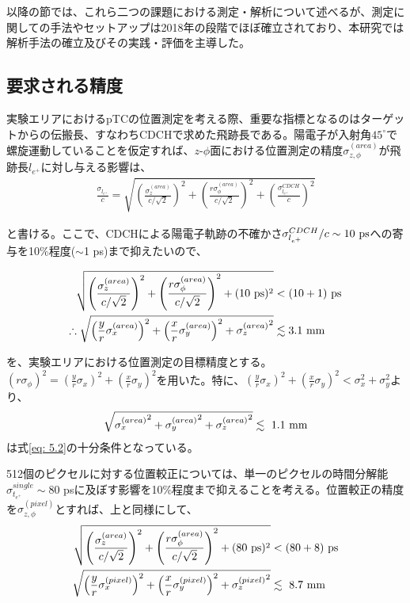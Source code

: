 \documentclass[Yonemoto_master.tex]{subfiles}
\begin{document}
以降の節では、これら二つの課題における測定・解析について述べるが、測定に関しての手法やセットアップは2018年の段階でほぼ確立されており、本研究では解析手法の確立及びその実践・評価を主導した。

\subsection{要求される精度}
実験エリアにおけるpTCの位置測定を考える際、重要な指標となるのはターゲットからの伝搬長、すなわちCDCHで求めた飛跡長である。陽電子が入射角$45^\circ$で螺旋運動していることを仮定すれば、$z$-$\phi$面における位置測定の精度$\sigma_{z,\phi}^{(area)}$が飛跡長$l_{e^+}$に対し与える影響は、
\begin{align}
\frac{\sigma_{l_{e^+}}}{c}
= \sqrt{\left(\frac{\sigma_z^{(area)}}{c/\sqrt{2}}\right)^2 + \left(\frac{r\sigma_{\phi}^{(area)}}{c/\sqrt{2}}\right)^2 + \left(\frac{\sigma_{l_{e^+}}^{CDCH}}{c}\right)^2} 
\end{align}

と書ける。ここで、CDCHによる陽電子軌跡の不確かさ$\sigma_{l_{e^+}}^{CDCH}/c \sim 10 \ {\rm ps}$への寄与を10\%程度($\sim$1 ps)まで抑えたいので、

\begin{align}
\sqrt{\left(\frac{\sigma_z^{(area)}}{c/\sqrt{2}}\right)^2 + \left(\frac{r\sigma_{\phi}^{(area)}}{c/\sqrt{2}}\right)^2 + (10 \ {\rm ps})^2} &< (10 + 1) \ {\rm ps} \nonumber \\
\therefore \sqrt{ \left(\frac{y}{r}{\sigma_x^{(area)}}\right)^2 + \left(\frac{x}{r}{\sigma_y^{(area)}}\right)^2 + {\sigma_z^{(area)}}^2}&\lesssim 3.1 \ {\rm mm} \label{eq: 5.2}
\end{align}

\noindent を、実験エリアにおける位置測定の目標精度とする。$\left({r\sigma_{\phi}}\right)^2 = \left(\frac{y}{r}\sigma_x \right)^2 + \left(\frac{x}{r} \sigma_y\right)^2$を用いた。特に、$\left(\frac{y}{r}\sigma_x \right)^2 + \left(\frac{x}{r} \sigma_y\right)^2 < \sigma_x^2 + \sigma_y^2$より、
\begin{align} \label{eq: 5.3}
\sqrt{{\sigma_x^{(area)}}^2 + {\sigma_y^{(area)}}^2 + {\sigma_z^{(area)}}^2}  \lesssim \ 1.1 \ {\rm mm}
\end{align}
は式\ref{eq: 5.2}の十分条件となっている。

512個のピクセルに対する位置較正については、単一のピクセルの時間分解能$\sigma_{t_{e^+}}^{single} \sim 80$ psに及ぼす影響を10\%程度まで抑えることを考える。位置較正の精度を$\sigma_{z,\phi}^{(pixel)}$とすれば、上と同様にして、
\begin{align}
\sqrt{\left(\frac{\sigma_z^{(area)}}{c/\sqrt{2}}\right)^2 + \left(\frac{r\sigma_{\phi}^{(area)}}{c/\sqrt{2}}\right)^2 + (80 \ {\rm ps})^2} &< (80 + 8) \ {\rm ps} \nonumber \\
\sqrt{\left(\frac{y}{r}{\sigma_x^{(pixel)}}\right)^2 + \left(\frac{x}{r}{\sigma_y^{(pixel)}}\right)^2 + {\sigma_z^{(pixel)}}^2} &\lesssim \ 8.7 \  {\rm mm}
\end{align}
\end{document}
